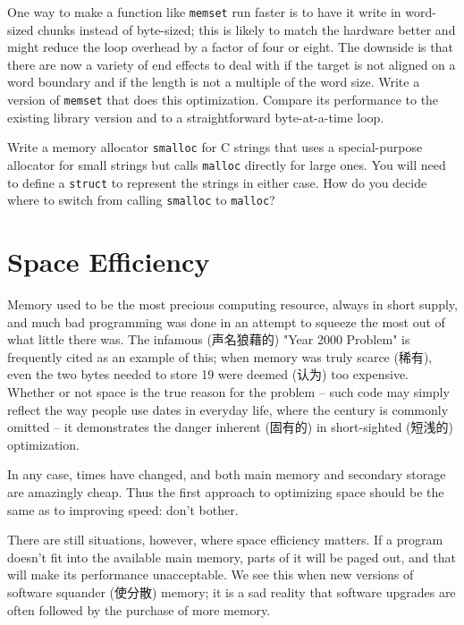 \begin{exercise}
    One way to make a function like \verb'memset' run faster is to have it
    write in word-sized chunks instead of byte-sized; this is likely to
    match the hardware better and might reduce the loop overhead by a
    factor of four or eight. The downside is that there are now a variety
    of end effects to deal with if the target is not aligned on a word
    boundary and if the length is not a multiple of the word size. Write a
    version of \verb'memset' that does this optimization. Compare its
    performance to the existing library version and to a straightforward
    byte-at-a-time loop.
\end{exercise}

\begin{exercise}
    Write a memory allocator \verb'smalloc' for C strings that uses a
    special-purpose allocator for small strings but calls \verb'malloc'
    directly for large ones. You will need to define a \verb'struct' to
    represent the strings in either case.  How do you decide where to
    switch from calling \verb'smalloc' to \verb'malloc'?
\end{exercise}

\section{Space Efficiency}

Memory used to be the most precious computing resource, always in short
supply, and much bad programming was done in an attempt to squeeze the most
out of what little there was. The infamous (声名狼藉的) "Year 2000 Problem"
is frequently cited as an example of this; when memory was truly scarce
(稀有), even the two bytes needed to store 19 were deemed (认为) too
expensive. Whether or not space is the true reason for the problem -- such
code may simply reflect the way people use dates in everyday life, where
the century is commonly omitted -- it demonstrates the danger inherent
(固有的) in short-sighted (短浅的) optimization.

In any case, times have changed, and both main memory and secondary storage
are amazingly cheap. Thus the first approach to optimizing space should be
the same as to improving speed: don't bother.

There are still situations, however, where space efficiency matters. If a
program doesn't fit into the available main memory, parts of it will be
paged out, and that will make its performance unacceptable. We see this
when new versions of software squander (使分散) memory; it is a sad reality
that software upgrades are often followed by the purchase of more memory.

